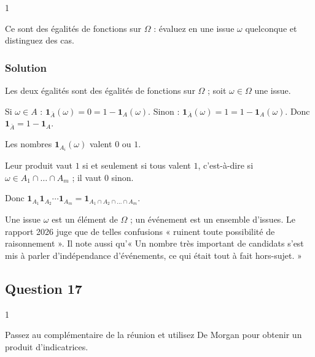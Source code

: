 \documentclass[11pt,a4paper]{article}
\begin{document}
\begin{indication}{1}

Ce sont des égalités de fonctions sur \(\Omega\) : évaluez en une issue \(\omega\) quelconque et distinguez des cas.

\end{indication}

\hypertarget{solution-15}{%
\subsubsection{Solution}\label{solution-15}}

Les deux égalités sont des égalités de fonctions sur \(\Omega\) ; soit \(\omega\in\Omega\) une issue.

Si \(\omega\in A\) : \(\mathbf 1_{\bar A}(\omega)=0=1-\mathbf 1_A(\omega)\). Sinon : \(\mathbf 1_{\bar A}(\omega)=1=1-\mathbf 1_A(\omega)\). Donc \(\boxed{\mathbf 1_{\bar A}=1-\mathbf 1_A}\).

Les nombres \(\mathbf 1_{A_i}(\omega)\) valent \(0\) ou \(1\).

Leur produit vaut \(1\) si et seulement si tous valent \(1\), c'est-à-dire si \(\omega\in A_1\cap\dots\cap A_m\) ; il vaut \(0\) sinon.

Donc \(\boxed{\mathbf 1_{A_1}\mathbf 1_{A_2}\cdots\mathbf 1_{A_m}=\mathbf 1_{A_1\cap A_2\cap\dots\cap A_m}}\).

\begin{piege}

Une issue \(\omega\) est un élément de \(\Omega\) ; un événement est un ensemble d'issues. Le rapport 2026 juge que de telles confusions « ruinent toute possibilité de raisonnement ». Il note aussi qu'« Un nombre très important de candidats s'est mis à parler d'indépendance d'événements, ce qui était tout à fait hors-sujet. »

\end{piege}

\hypertarget{question-17}{%
\subsection{Question 17}\label{question-17}}

\begin{indication}{1}

Passez au complémentaire de la réunion et utilisez De Morgan pour obtenir un produit d'indicatrices.

\end{indication}
\end{document}
